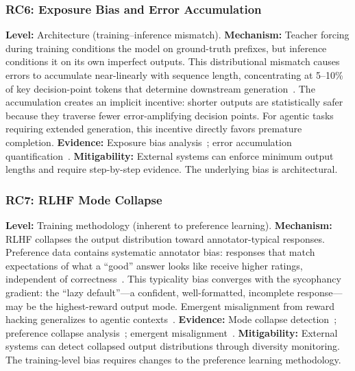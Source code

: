 \subsubsection{RC6: Exposure Bias and Error Accumulation}
\label{rc:exposure}

\textbf{Level:} Architecture (training--inference mismatch).
\textbf{Mechanism:} Teacher forcing during training conditions the model on ground-truth prefixes, but inference conditions it on its own imperfect outputs.
This distributional mismatch causes errors to accumulate near-linearly with sequence length, concentrating at 5--10\% of key decision-point tokens that determine downstream generation~\cite{erroraccumulation2025}.
The accumulation creates an implicit incentive: shorter outputs are statistically safer because they traverse fewer error-amplifying decision points.
For agentic tasks requiring extended generation, this incentive directly favors premature completion.
\textbf{Evidence:} Exposure bias analysis~\cite{exposurebias2022}; error accumulation quantification~\cite{erroraccumulation2025}.
\textbf{Mitigability:} External systems can enforce minimum output lengths and require step-by-step evidence.
The underlying bias is architectural.


\subsubsection{RC7: RLHF Mode Collapse}
\label{rc:rlhf}

\textbf{Level:} Training methodology (inherent to preference learning).
\textbf{Mechanism:} RLHF collapses the output distribution toward annotator-typical responses.
Preference data contains systematic annotator bias: responses that match expectations of what a ``good'' answer looks like receive higher ratings, independent of correctness~\cite{modecollapse2024,preferencecollapse2024}.
This typicality bias converges with the sycophancy gradient: the ``lazy default''---a confident, well-formatted, incomplete response---may be the highest-reward output mode.
Emergent misalignment from reward hacking generalizes to agentic contexts~\cite{anthropic2025misalignment}.
\textbf{Evidence:} Mode collapse detection~\cite{modecollapse2024}; preference collapse analysis~\cite{preferencecollapse2024}; emergent misalignment~\cite{anthropic2025misalignment}.
\textbf{Mitigability:} External systems can detect collapsed output distributions through diversity monitoring.
The training-level bias requires changes to the preference learning methodology.


